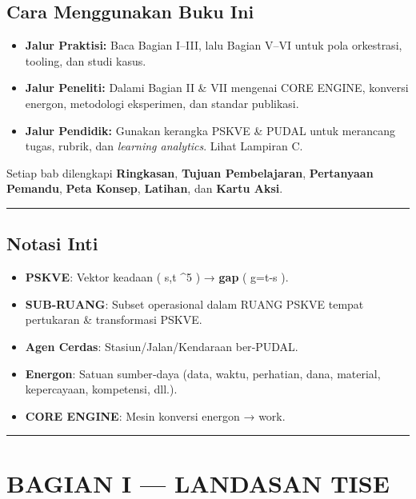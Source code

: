 \documentclass[
  letterpaper,
  DIV=11,
  numbers=noendperiod]{scrartcl}
\providecommand{\tightlist}{%
  \setlength{\itemsep}{0pt}\setlength{\parskip}{0pt}}
\begin{document}
\subsection{Cara Menggunakan Buku Ini}\label{cara-menggunakan-buku-ini}

\begin{itemize}
\tightlist
\item
  \textbf{Jalur Praktisi:} Baca Bagian I--III, lalu Bagian V--VI untuk
  pola orkestrasi, tooling, dan studi kasus.
\item
  \textbf{Jalur Peneliti:} Dalami Bagian II \& VII mengenai CORE ENGINE,
  konversi energon, metodologi eksperimen, dan standar publikasi.
\item
  \textbf{Jalur Pendidik:} Gunakan kerangka PSKVE \& PUDAL untuk
  merancang tugas, rubrik, dan \emph{learning analytics}. Lihat Lampiran
  C.
\end{itemize}

Setiap bab dilengkapi \textbf{Ringkasan}, \textbf{Tujuan Pembelajaran},
\textbf{Pertanyaan Pemandu}, \textbf{Peta Konsep}, \textbf{Latihan}, dan
\textbf{Kartu Aksi}.

\begin{center}\rule{0.5\linewidth}{0.5pt}\end{center}

\subsection{Notasi Inti}\label{notasi-inti}

\begin{itemize}
\tightlist
\item
  \textbf{PSKVE}: Vektor keadaan ( s,t \in {}\^{}5 ) →
  \textbf{gap} ( g=t-s ).
\item
  \textbf{SUB‑RUANG}: Subset operasional dalam RUANG PSKVE tempat
  pertukaran \& transformasi PSKVE.
\item
  \textbf{Agen Cerdas}: Stasiun/Jalan/Kendaraan ber‑PUDAL.
\item
  \textbf{Energon}: Satuan sumber‑daya (data, waktu, perhatian, dana,
  material, kepercayaan, kompetensi, dll.).
\item
  \textbf{CORE ENGINE}: Mesin konversi energon → work.
\end{itemize}

\begin{center}\rule{0.5\linewidth}{0.5pt}\end{center}

\section{BAGIAN I --- LANDASAN TISE}\label{bagian-i-landasan-tise}
\end{document}
